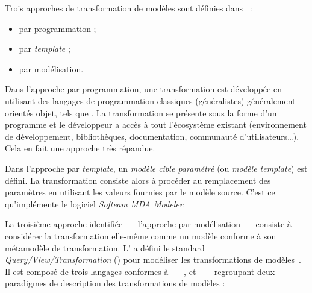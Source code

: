 Trois approches de transformation de modèles sont définies
dans~\cite{Blanc2005} :
\begin{itemize}
  \item par programmation ;
  \item par \emph{template} ;
  \item par modélisation.
\end{itemize}

Dans l'approche par programmation, une transformation est développée 
en utilisant des langages de programmation \og classiques \fg{} (généralistes)
généralement orientés objet, tels que {\java}. La transformation se présente
sous la forme d'un programme %
et le développeur
a accès à tout l'écosystème existant (environnement de développement,
bibliothèques, documentation, communauté d'utilisateurs\ldots). Cela en fait
une approche très répandue.

Dans l'approche par \emph{template}, un \emph{modèle cible paramétré}
(ou \emph{modèle template}) est défini. 
 La transformation consiste alors à procéder au remplacement des paramètres en
utilisant les valeurs fournies par le modèle source. %
C'est ce qu'implémente le logiciel \textit{Softeam MDA Modeler}.


La troisième approche identifiée ---~l'approche par modélisation~--- consiste à
considérer la transformation elle-même comme un modèle conforme à son
métamodèle de transformation. L'{\omg} a défini le standard
\emph{Query/View/Transformation} ({\qvt}) pour modéliser les transformations de
modèles~\cite{omgqvt1}. Il est composé de trois langages conformes à {\mof}
---~{\qvto}, {\qvtr} et {\qvtc}~--- regroupant deux paradigmes de description
des transformations de modèles :


